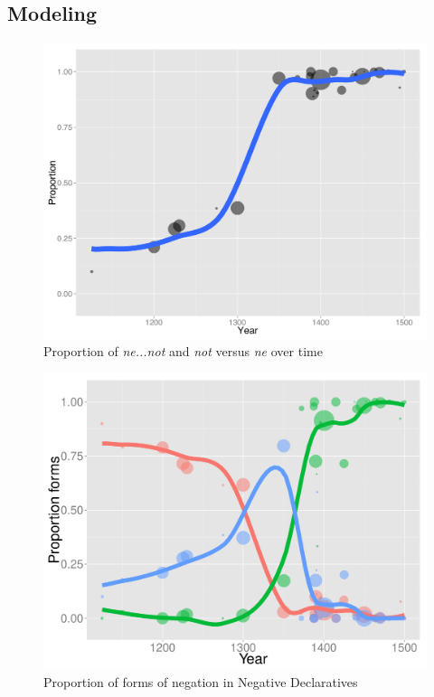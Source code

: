 \subsection{Modeling}

\begin{figure}
\centering
     \includegraphics[width=\textwidth]{lump-plot1.pdf}
\caption{Proportion of \textit{\color{blue} ne...not} and \textit{\color{green} not}  versus  \textit{\color{red}  ne} over time}
\label{lump-plot1}
\end{figure}

\begin{figure}
\centering
     \includegraphics[width=\textwidth]{neg-year-lines.pdf}
\caption{Proportion of forms of negation in Negative Declaratives}
\label{neg-three-plot}
\end{figure}


